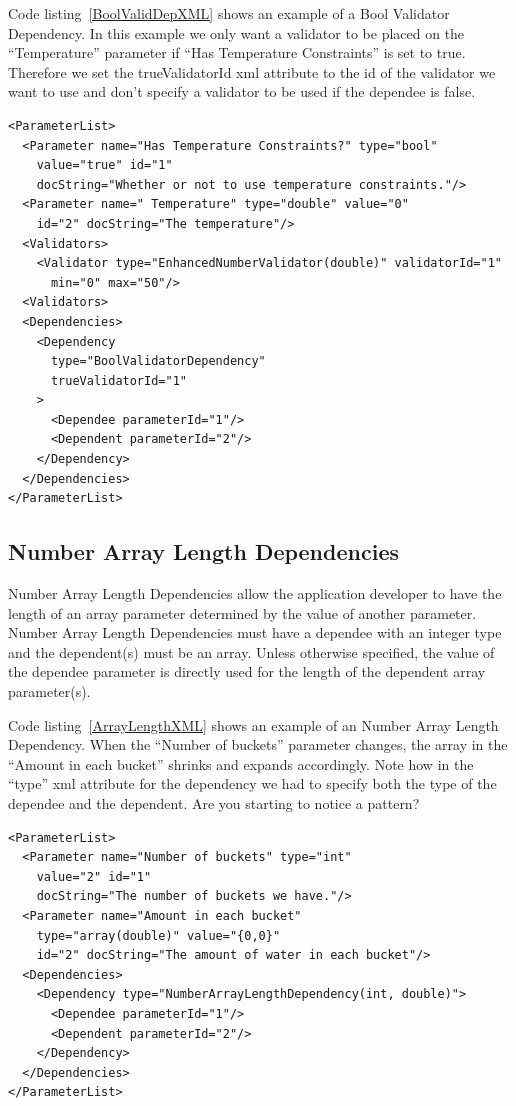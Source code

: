 Code listing~\ref{BoolValidDepXML} shows an example of a Bool Validator Dependency. In this example we only want a validator to be placed on the
``Temperature'' parameter if ``Has Temperature Constraints'' is set to true. Therefore we set the trueValidatorId xml attribute to the id of the
validator we want to use and don't specify a validator to be used if the dependee is false.
\begin{lstlisting}[caption={Example usage of a Bool Validator Dependency}, label=BoolValidDepXML]
<ParameterList>
  <Parameter name="Has Temperature Constraints?" type="bool" 
    value="true" id="1" 
    docString="Whether or not to use temperature constraints."/>
  <Parameter name=" Temperature" type="double" value="0"
    id="2" docString="The temperature"/>
  <Validators>
    <Validator type="EnhancedNumberValidator(double)" validatorId="1"
      min="0" max="50"/>
  <Validators>
  <Dependencies>
    <Dependency 
      type="BoolValidatorDependency" 
      trueValidatorId="1"
    >
      <Dependee parameterId="1"/>
      <Dependent parameterId="2"/>
    </Dependency>
  </Dependencies>
</ParameterList>
\end{lstlisting}

\subsection{Number Array Length Dependencies}
Number Array Length Dependencies allow the application developer to have the length of an array parameter determined by the value of another parameter. Number Array Length
Dependencies must have a dependee with an integer type and the dependent(s) must be an array. Unless otherwise specified, the value of the dependee parameter is directly
used for the length of the dependent array parameter(s). 

Code listing~\ref{ArrayLengthXML} shows an example of an Number Array Length Dependency. When the ``Number of buckets'' parameter changes, the array in the ``Amount
in each bucket'' shrinks and expands accordingly. Note how in the ``type'' xml attribute for the dependency we had to specify both the type of the dependee and the
dependent. Are you starting to notice a pattern?
\begin{lstlisting}[caption={Example usage of a Number Array Length Dependency}, label=ArrayLengthXML]
<ParameterList>
  <Parameter name="Number of buckets" type="int"
    value="2" id="1" 
    docString="The number of buckets we have."/>
  <Parameter name="Amount in each bucket" 
    type="array(double)" value="{0,0}"
    id="2" docString="The amount of water in each bucket"/>
  <Dependencies>
    <Dependency type="NumberArrayLengthDependency(int, double)">
      <Dependee parameterId="1"/>
      <Dependent parameterId="2"/>
    </Dependency>
  </Dependencies>
</ParameterList>
\end{lstlisting}

